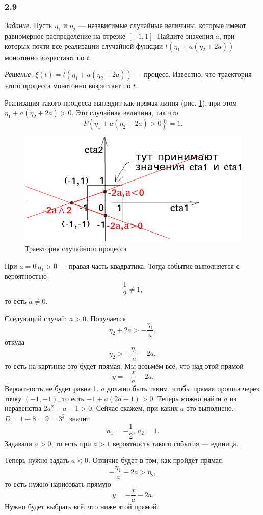 \subsubsection*{2.9}

\textit{Задание.}
Пусть $ \eta_1$ и $ \eta_2$ --- независимые случайные величины,
которые имеют равномерное распределение на отрезке $ \left[ -1, 1 \right] $.
Найдите значения $a$, при которых почти все реализации случайной функции
$t \left( \eta_1 + a \left( \eta_2 + 2a \right) \right) $ монотонно возрастают по $t$.

\textit{Решение.}
$ \xi \left( t \right) = t \left( \eta_1 + a \left( \eta_2 + 2a \right) \right) $ --- процесс.
Известно, что траектория этого процесса монотонно возрастает по $t$.

Реализация такого процесса выглядит как прямая линия (рис. \ref{fig:29}),
при этом $ \eta_1 + a \left( \eta_2 + 2a \right) > 0$.
Это случайная величина, так что
$$P \left\{ \eta_1 + a \left( \eta_2 + 2a \right) > 0 \right\} = 1.$$

\begin{figure}[h!]
 \centering
 \includegraphics[width=.5\textwidth]{./pictures/2_9.png}
 \caption{Траектория случайного процесса}
 \label{fig:29}
\end{figure}

При $a = 0 \, \eta_1 > 0$ --- правая часть квадратика.
Тогда событие выполняется с вероятностью
$$ \frac{1}{2} \neq 1,$$
то есть $a \neq 0$.

Следующий случай: $a > 0$.
Получается
$$ \eta_2 + 2a >
  -\frac{ \eta_1}{a},$$
откуда
$$ \eta_2 >
  -\frac{ \eta_1}{a} - 2a,$$
то есть на картинке это будет прямая.
Мы возьмём всё, что над этой прямой
$$y =
  -\frac{x}{a} - 2a.$$
Вероятность не будет равна 1.
$a$ должно быть таким, чтобы прямая прошла через точку $ \left( -1, -1 \right) $,
то есть $-1 + a \left( 2a - 1 \right) > 0$.
Теперь можно найти $a$ из неравенства $2a^2 - a - 1 > 0$.
Сейчас скажем, при каких $a$ это выполнено.
$D = 1 + 8 = 9 = 3^2$, значит
$$a_1 = - \frac{1}{2}, \,
  a_2 = 1.$$
Задавали $a > 0$, то есть при $a > 1$ вероятность такого события --- единица.

Теперь нужно задать $a < 0$.
Отличие будет в том, как пройдёт прямая.
$$-\frac{ \eta_1}{a} - 2a >
  \eta_2,$$
то есть нужно нарисовать прямую
$$y =
  -\frac{x}{a} - 2a.$$
Нужно будет выбрать всё, что ниже этой прямой.

